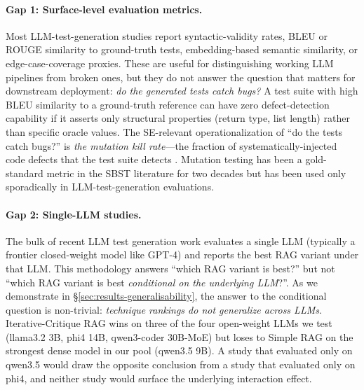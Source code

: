 \documentclass[smallextended]{svjour3}
\begin{document}
\paragraph{Gap 1: Surface-level evaluation metrics.}
Most LLM-test-generation studies report syntactic-validity rates,
BLEU or ROUGE similarity to ground-truth tests, embedding-based
semantic similarity, or edge-case-coverage proxies. These are useful
for distinguishing working LLM pipelines from broken ones, but they
do not answer the question that matters for downstream deployment:
\emph{do the generated tests catch bugs?} A test suite with high
BLEU similarity to a ground-truth reference can have zero
defect-detection capability if it asserts only structural properties
(return type, list length) rather than specific oracle values. The
SE-relevant operationalization of ``do the tests catch bugs?'' is
\emph{the mutation kill rate}—the fraction of
systematically-injected code defects that the test suite detects
\citep{andrews2005,just2014}. Mutation testing has been a
gold-standard metric in the SBST literature for two decades but has
been used only sporadically in LLM-test-generation evaluations.

\paragraph{Gap 2: Single-LLM studies.}
The bulk of recent LLM test generation work evaluates a single LLM
(typically a frontier closed-weight model like GPT-4) and reports
the best RAG variant under that LLM. This methodology answers
``which RAG variant is best?'' but not ``which RAG variant is best
\emph{conditional on the underlying LLM}?''. As we demonstrate in
\S\ref{sec:results-generalisability}, the answer to the conditional
question is non-trivial: \emph{technique rankings do not generalize
across LLMs}. Iterative-Critique RAG wins on three of the four
open-weight LLMs we test (llama3.2 3B, phi4 14B, qwen3-coder 30B-MoE)
but loses to Simple RAG on the strongest dense model in our pool
(qwen3.5 9B). A study that evaluated only on qwen3.5 would draw the
opposite conclusion from a study that evaluated only on phi4, and
neither study would surface the underlying interaction effect.
\end{document}
